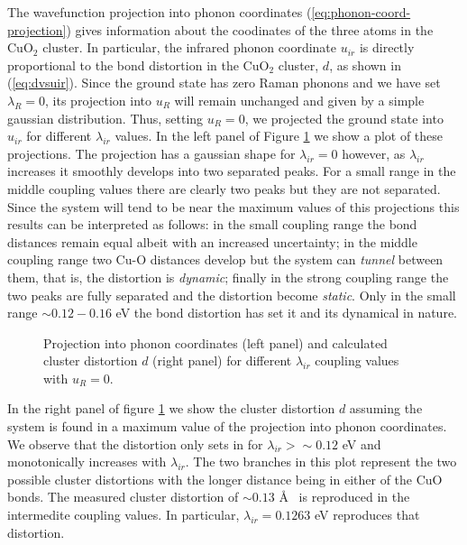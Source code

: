 The wavefunction projection into phonon coordinates (\ref{eq:phonon-coord-projection}) gives information about the coodinates of the three atoms in the CuO$_2$ cluster.
In particular, the infrared phonon coordinate $u_{ir}$ is directly proportional to the bond distortion in the CuO$_2$ cluster, $d$, as shown in (\ref{eq:dvsuir}).
Since the ground state has zero Raman phonons and we have set $\lambda_R=0$, its projection into $u_R$ will remain unchanged and given by a simple gaussian distribution.
Thus, setting $u_R=0$, we projected the ground state into $u_{ir}$ for different $\lambda_{ir}$ values.
In the left panel of Figure \ref{fig:uirCoupl} we show a plot of these projections.
The projection has a gaussian shape for $\lambda_{ir}=0$ however, as $\lambda_{ir}$ increases it smoothly develops into two separated peaks.
For a small range in the middle coupling values there are clearly two peaks but they are not separated. 
Since the system will tend to be near the maximum values of this projections this results can be interpreted as follows: in the small coupling range the bond distances remain equal albeit with an increased uncertainty; in the middle coupling range two Cu-O distances develop but the system can \textit{tunnel} between them, that is, the distortion is \textit{dynamic}; finally in the strong coupling range the two peaks are fully separated and the distortion become \textit{static}.
Only in the small range $\sim 0.12 - 0.16$ eV the bond distortion has set it and its dynamical in nature.
%
\begin{figure}[ht]
  \centering
  
  \caption{Projection into phonon coordinates (left panel) and calculated cluster distortion $d$ (right panel) for different $\lambda_{ir}$ coupling values with $u_R=0$.}
  \label{fig:uirCoupl}
\end{figure}

In the right panel of figure \ref{fig:uirCoupl} we show the cluster distortion $d$ assuming the system is found in a maximum value of the projection into phonon coordinates.
We observe that the distortion only sets in for $\lambda_{ir} > \sim 0.12$ eV and monotonically increases with $\lambda_{ir}$.
The two branches in this plot represent the two possible cluster distortions with the longer distance being in either of the CuO bonds.
The measured cluster distortion of $\sim 0.13$ \AA\ \cite{MustredeLeon1990} is reproduced in the intermedite coupling values. 
In particular, $\lambda_{ir}=0.1263$ eV reproduces that distortion.

